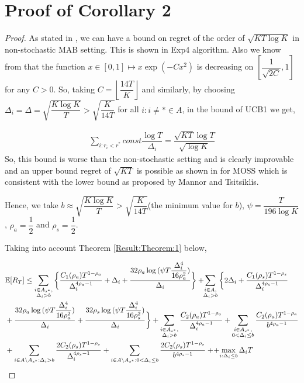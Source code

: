 \section{Proof of Corollary 2}
\label{App:Proof:Corollary:2}
\begin{proof}
As stated in \citet{auer2010ucb}, we can have a bound on regret of the order of $\sqrt{KT\log K}$ in non-stochastic MAB setting. This is shown in Exp4\cite{auer2002nonstochastic} algorithm. Also we know from \citet{bubeck2011pure} that the function $x\in [0,1]\mapsto x\exp(-Cx^2)$ is  decreasing on $\left[\dfrac{1}{\sqrt{2C}},1\right ]$ for any $C>0$. So, taking $C=\left\lfloor \dfrac{14 T}{K}\right\rfloor$ and similarly, by choosing  $\Delta_{i}=\Delta=\sqrt{\dfrac{K\log K}{T}}>\sqrt{\dfrac{K}{14 T}}$ for all ${i:i\neq *}\in A$, in the bound of UCB1\cite{auer2002finite} we get,

\begin{align*}
\sum_{i:r_{i}<r^{*}}const \dfrac{\log T}{\Delta_{i}}=\dfrac{\sqrt{KT}\log T}{\sqrt{\log K}}
\end{align*}
So, this bound is worse than the non-stochastic setting and is clearly improvable and an upper bound regret of $\sqrt{KT}$ is possible as shown in \citet{audibert2009minimax} for MOSS which is consistent with the lower bound as proposed by Mannor and Tsitsiklis\cite{mannor2004sample}.

	Hence, we take $b\approx\sqrt{\dfrac{K\log K}{T}} > \sqrt{\dfrac{K}{14 T}}$(the minimum value for $b$), $\psi=\dfrac{T}{196 \log K}$, $\rho_{a}=\dfrac{1}{2}$ and $\rho_{s}=\dfrac{1}{2}$.
	
	Taking into account Theorem \ref{Result:Theorem:1} below, 
	
\begin{align*}
&\mathbb{E} [R_{T}]\leq 
\sum\limits_{\substack{i\in A_{s^{*}},\\\Delta_{i} > b}}\bigg\lbrace \dfrac{C_1(\rho_{a})T^{1-\rho_{a}}}{\Delta_{i}^{4\rho_{a}-1}} + \Delta_{i}
 + \frac{32\rho_{a}\log{(\psi T\dfrac{\Delta_{i}^{4}}{16\rho_{a}^{2}})}}{\Delta_{i}} \bigg\rbrace
 + \! \! \sum\limits_{\substack{i\in A,\\\Delta_{i} > b}} \bigg\lbrace 2\Delta_{i}+
\dfrac{C_1(\rho_{s})T^{1-\rho_{s}}}{\Delta_{i}^{4\rho_{s}-1}} \\
&+ \frac{32\rho_{a}\log{(\psi T\dfrac{\Delta_{i}^{4}}{16\rho_{a}^{2}})}}{\Delta_{i}} 
+ \dfrac{32\rho_{s}\log{(\psi T\dfrac{\Delta_{i}^{4}}{16\rho_{s}^{2}})}}{\Delta_{i}}\bigg\rbrace 
+ \sum\limits_{\substack{i\in A_{s^{*}},\\ \Delta_{i} > b}} 
\frac{C_2(\rho_{a})T^{1-\rho_{a}}}{\Delta_{i}^{4\rho_{a}-1}}
+\sum\limits_{\substack{i\in A_{s^{*}},\\0 < \Delta_{i}\leq b}}\frac{C_2(\rho_a)T^{1-\rho_{a}}}{b^{4\rho_{a} -1}}\\ 
 & + \sum_{i\in A\setminus A_{s^*}: \Delta_{i} > b}\dfrac{2C_{2}(\rho_{s})T^{1-\rho_{s}}}{\Delta_{i}^{4\rho_{s}-1}} +\sum_{i\in A\setminus A_{s^*}: 0 < \Delta_{i} \leq b}\dfrac{2C_{2}(\rho_{s})T^{1-\rho_{s}}}{b^{4\rho_{s}-1}} +
 \!+\! \max\limits_{i:\Delta_{i}\leq b}\Delta_{i}T
\end{align*}


\end{proof}
